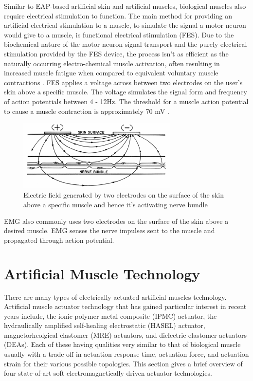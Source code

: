Similar to EAP-based artificial skin and artificial muscles, biological muscles also require electrical stimulation to function. The main method for providing an artificial electrical stimulation to a muscle, to simulate the signal a motor neuron would give to a muscle, is functional electrical stimulation (FES). Due to the biochemical nature of the motor neuron signal transport and the purely electrical stimulation provided by the FES device, the process isn't as efficient as the naturally occurring electro-chemical muscle activation, often resulting in increased muscle fatigue when compared to equivalent voluntary muscle contractions \citep{Ibitoye2016}. FES applies a voltage across between two electrodes on the user's skin above a specific muscle. The voltage simulates the signal form and frequency of action potentials between 4 - 12Hz\citep{Popovic2004}. The threshold for a muscle action potential to cause a muscle contraction is approximately 70 mV \cite{Schmidt-Nielsen2002}.
\begin{figure}[h!]
  \centering
  \includegraphics[width=8cm]{Figures/FES_electric_field.PNG}
  \caption{Electric field generated by two electrodes on the surface of the skin above a specific muscle and hence it's activating nerve bundle\citep{Bajd2010}}
  \label{fig:Muscle}
\end{figure}
EMG also commonly uses two electrodes on the surface of the skin above a desired muscle. EMG senses the nerve impulses sent to the muscle and propagated through action potential. 



\section{Artificial Muscle Technology}
There are many types of electrically actuated artificial muscles technology. Artificial muscle actuator technology that has gained particular interest in recent years include, the ionic polymer-metal composite (IPMC) actuator, the hydraulically amplified self‐healing electrostatic (HASEL) actuator, magnetorheolgical elastomer (MRE) actuators, and dielectric elastomer actuators (DEAs). Each of these having qualities very similar to that of biological muscle usually with a trade-off in actuation response time, actuation force, and actuation strain for their various possible topologies. This section gives a brief overview of four state-of-art soft electromagnetically driven actuator technologies.

